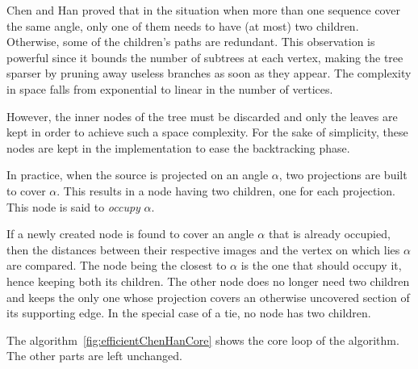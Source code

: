 Chen and Han proved that in the situation when more than one sequence cover the same angle, only one of them needs to have (at most) two children. Otherwise, some of the children's paths are redundant. This observation is powerful since it bounds the number of subtrees at each vertex, making the tree sparser by pruning away useless branches as soon as they appear. The complexity in space falls from exponential to linear in the number of vertices.\par
However, the inner nodes of the tree must be discarded and only the leaves are kept in order to achieve such a space complexity. For the sake of simplicity, these nodes are kept in the implementation to ease the backtracking phase.\par
In practice, when the source is projected on an angle $\alpha$, two projections are built to cover $\alpha$. This results in a node having two children, one for each projection. This node is said to \textit{occupy} $\alpha$.\par
If a newly created node is found to cover an angle $\alpha$ that is already occupied, then the distances between their respective images and the vertex on which lies $\alpha$ are compared. The node being the closest to $\alpha$ is the one that should occupy it, hence keeping both its children. The other node does no longer need two children and keeps the only one whose projection covers an otherwise uncovered section of its supporting edge. In the special case of a tie, no node has two children.\par
The algorithm~\ref{fig:efficientChenHanCore} shows the core loop of the algorithm. The other parts are left unchanged.

